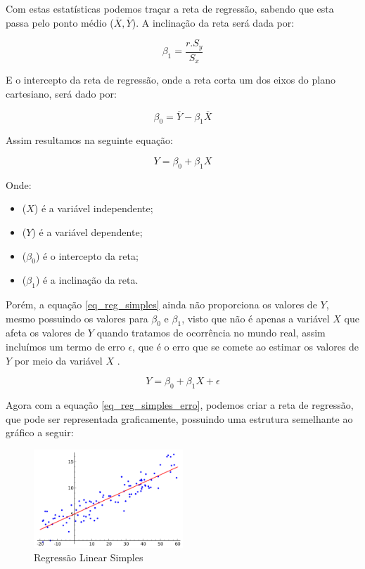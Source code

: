 \documentclass[
    12pt,               %
    openright,          %
    oneside,            %
    a4paper,            %
    english,            %
    brazil              %
    ]{abntex2}
\begin{document}
Com estas estatísticas podemos traçar a reta de regressão, sabendo que esta passa pelo ponto médio
($\overline{X}, \overline{Y}$). A inclinação da reta será dada por:

\begin{equation}
    \label{inclinacao_reta}
    \beta_1 = \frac{r.S_y}{S_x}
\end{equation}

E o intercepto da reta de regressão, onde a reta corta um dos eixos do plano cartesiano, 
será dado por:

\begin{equation}
    \label{intercepto_reta}
    \beta_0 = \overline{Y} - \beta_1 \overline{X}
\end{equation}

Assim resultamos na seguinte equação:

\begin{equation}
\label{eq_reg_simples}
    Y = \beta_0 + \beta_1X
\end{equation}

Onde:
\begin{itemize}
    \item ($X$) é a variável independente;
    \item ($Y$) é a variável dependente;
    \item ($\beta_0$) é o intercepto da reta;
    \item ($\beta_1$) é a inclinação da reta. 
\end{itemize}

Porém, a equação \ref{eq_reg_simples} ainda não proporciona os valores de $Y$, mesmo possuindo
os valores para $\beta_0$ e $\beta_1$, visto que não é apenas a variável  $X$ que afeta os valores de
$Y$ quando tratamos de ocorrência no mundo real, assim incluímos um termo de erro $\epsilon$, que é
o erro que se comete ao estimar os valores de $Y$ por meio da variável $X$ \cite{modelos_regressao_linear}.

\begin{equation}
    \label{eq_reg_simples_erro}
    Y = \beta_0 + \beta_1X + \epsilon
\end{equation}

Agora com a equação \ref{eq_reg_simples_erro}, podemos criar a reta de regressão, que pode ser
representada graficamente, possuindo uma estrutura semelhante ao gráfico a seguir:

\begin{figure}[H]
    \centering
    \caption{\label{Regressão Linear Simples}Regressão Linear Simples}
    \includegraphics[width=0.50\textwidth]{../Imgs/reg_linear_simples.png}
\end{figure}
\end{document}
